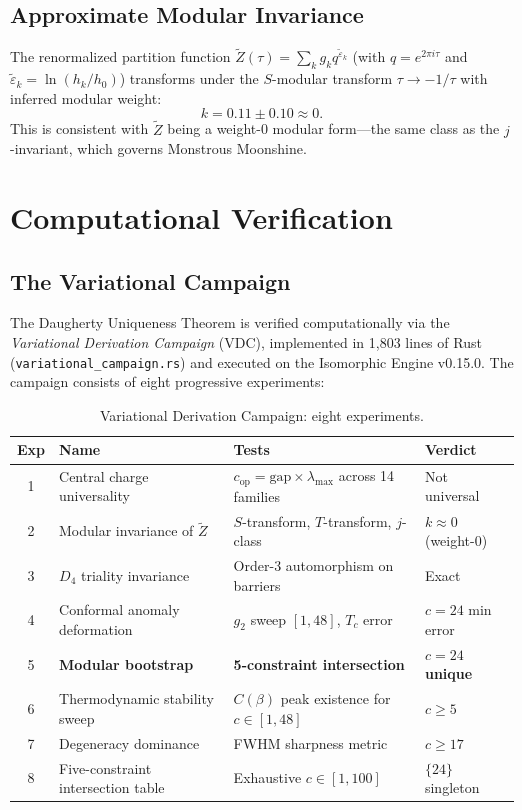 \documentclass[12pt,a4paper]{article}
\theoremstyle{definition}
\theoremstyle{remark}
\begin{document}
\subsection{Approximate Modular Invariance}

The renormalized partition function $\tilde{Z}(\tau) = \sum_k g_k q^{\tilde{\varepsilon}_k}$ (with $q = e^{2\pi i \tau}$ and $\tilde{\varepsilon}_k = \ln(h_k/h_0)$) transforms under the $S$-modular transform $\tau \to -1/\tau$ with inferred modular weight:
\begin{equation}
k = 0.11 \pm 0.10 \approx 0.
\end{equation}
This is consistent with $\tilde{Z}$ being a weight-0 modular form---the same class as the $j$-invariant, which governs Monstrous Moonshine.

\section{Computational Verification}
\label{sec:verification}

\subsection{The Variational Campaign}

The Daugherty Uniqueness Theorem is verified computationally via the \emph{Variational Derivation Campaign} (VDC), implemented in 1,803 lines of Rust (\texttt{variational\_campaign.rs}) and executed on the Isomorphic Engine v0.15.0.  The campaign consists of eight progressive experiments:

\begin{table}[H]
\centering
\caption{Variational Derivation Campaign: eight experiments.}
\label{tab:vdc}
\begin{tabular}{@{}clll@{}}
\toprule
\textbf{Exp} & \textbf{Name} & \textbf{Tests} & \textbf{Verdict} \\
\midrule
1 & Central charge universality & $c_{\text{op}} = \text{gap} \times \lambda_{\max}$ across 14 families & Not universal \\
2 & Modular invariance of $\tilde{Z}$ & $S$-transform, $T$-transform, $j$-class & $k \approx 0$ (weight-0) \\
3 & $D_4$ triality invariance & Order-3 automorphism on barriers & Exact \\
4 & Conformal anomaly deformation & $g_2$ sweep $[1, 48]$, $T_c$ error & $c = 24$ min error \\
5 & \textbf{Modular bootstrap} & \textbf{5-constraint intersection} & \textbf{$c = 24$ unique} \\
6 & Thermodynamic stability sweep & $C(\beta)$ peak existence for $c \in [1, 48]$ & $c \ge 5$ \\
7 & Degeneracy dominance & FWHM sharpness metric & $c \ge 17$ \\
8 & Five-constraint intersection table & Exhaustive $c \in [1, 100]$ & $\{24\}$ singleton \\
\bottomrule
\end{tabular}
\end{table}
\end{document}
